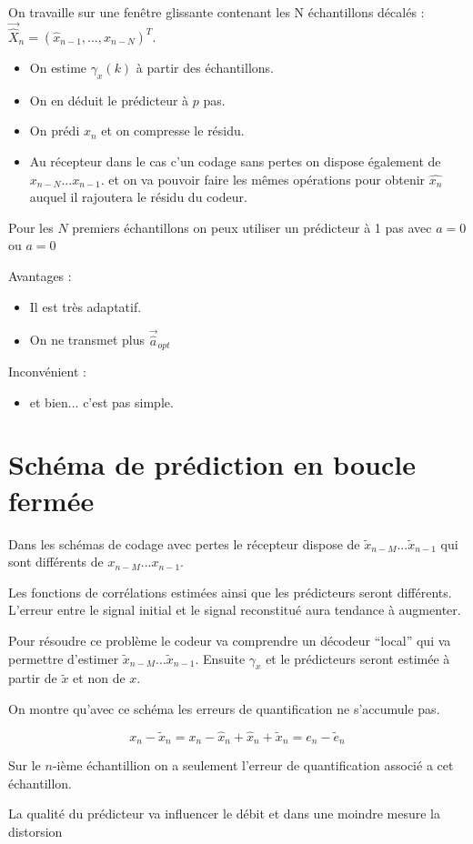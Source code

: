 \documentclass[main.tex]{subfiles}
\begin{document}
On travaille sur une fenêtre glissante contenant les N échantillons décalés : $\vec{\hat{X}}_n = (\hat{x}_{n-1}, ..., \hat{x}_{n-N})^T$.
\begin{itemize}
\item On estime $\gamma_x(k)$ à partir des échantillons.
\item On en déduit le prédicteur à $p$ pas.
\item On prédi $x_n$ et on compresse le résidu.
\item Au récepteur dans le cas c'un codage sans pertes on dispose également de $x_{n-N} ... x_{n-1}$. et on va pouvoir faire les mêmes opérations pour obtenir $\hat{x_n}$ auquel il rajoutera le résidu du codeur.

\end{itemize}
  \begin{rem}
    Pour les $N$ premiers échantillons on peux utiliser un prédicteur à 1 pas avec $a=0$ ou $a=0$
  \end{rem}

Avantages :
  \begin{itemize}
  \item Il est très adaptatif.
  \item On ne transmet plus $\vec{\hat{a}}_{opt}$
  \end{itemize}

  Inconvénient :
  \begin{itemize}
  \item et bien... c'est pas simple.
  \end{itemize}

\section{Schéma de prédiction en boucle fermée}

Dans les schémas de codage avec pertes le récepteur dispose de $\tilde{x}_{n-M} ... \tilde{x}_{n-1}$ qui sont différents de $x_{n-M} ... x_{n-1}$.

Les fonctions de corrélations estimées ainsi que les prédicteurs seront différents. L'erreur entre le signal initial et le signal reconstitué aura tendance à augmenter.

Pour résoudre ce problème le codeur va comprendre un décodeur ``local'' qui va permettre d'estimer $\tilde{x}_{n-M} ... \tilde{x}_{n-1}$. Ensuite $\gamma_x$ et le prédicteurs seront estimée à partir de $\tilde{x}$ et non de $x$.

On montre qu'avec ce schéma les erreurs de quantification ne s'accumule pas.

\[
  x_n-\tilde{x}_n= x_n -\hat{x}_n+\hat{x}_n+\tilde{x}_n = e_n - \tilde{e}_n
\]

Sur le $n$-ième échantillion on a seulement l'erreur de quantification associé a cet échantillon.

\begin{rem}
  La qualité du prédicteur va influencer le débit et  dans une moindre mesure la distorsion 
\end{rem}
\end{document}

